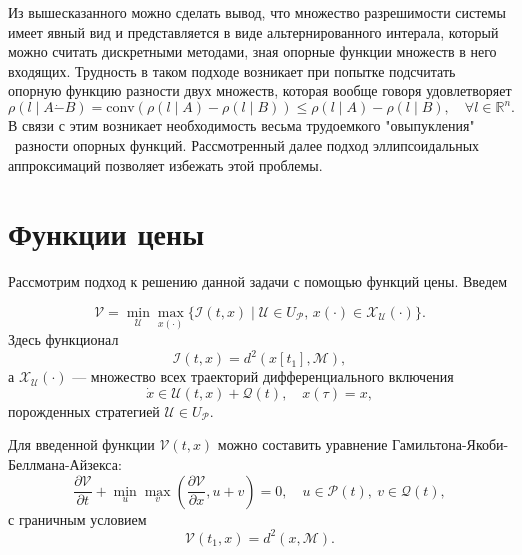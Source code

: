 Из вышесказанного можно сделать вывод, что множество разрешимости системы имеет явный вид и
 представляется в виде альтернированного интерала, который можно считать дискретными методами,
 зная опорные функции множеств в него входящих. Трудность в таком подходе возникает при попытке
 подсчитать опорную функцию разности двух множеств, которая вообще говоря удовлетворяет
\begin{equation*}
    \rho(l \mid A \dot{-} B) = \text{conv}( \rho(l \mid A) - \rho(l \mid B)) \le \rho(l \mid A) -
      \rho(l \mid B), \quad \forall l \in \mathbb{R}^n.
\end{equation*}
В связи с этим возникает необходимость весьма трудоемкого "овыпукления" \ разности опорных функций.
Рассмотренный далее подход эллипсоидальных аппроксимаций позволяет избежать этой проблемы.

\section{Функции цены}
Рассмотрим подход к решению данной задачи с помощью функций цены. Введем

\begin{equation*}
    \mathcal{V} = \min_{\mathcal{U}} \max_{x(\cdot)} \{\mathcal{I}(t,x) \mid \mathcal{U} \in 
     U_{\mathcal{P}}, \, x(\cdot) \in \mathcal{X}_{\mathcal{U}}(\cdot) \}.
\end{equation*}
Здесь функционал
\begin{equation*}
     \mathcal{I}(t,x) = d^2(x[t_1], \mathcal{M}),
\end{equation*}
а \( \mathcal{X}_{\mathcal{U}}(\cdot) \) --- множество всех траекторий дифференциального включения
\begin{equation*}
    \dot{x} \in \mathcal{U}(t,x) + \mathcal{Q}(t), \quad x(\tau) = x,
\end{equation*}
порожденных стратегией \( \mathcal{U} \in U_{\mathcal{P}} \).

Для введенной функции \( \mathcal{V}(t,x) \) можно составить уравнение Гамильтона-Якоби-Беллмана-Айзекса:
\begin{equation}\label{HJBI}
    \frac{\partial \mathcal{V}}{\partial t} + \min_u \max_v \left( \frac{\partial \mathcal{V}}
     {\partial x}, u + v \right) = 0, \quad u \in \mathcal{P}(t), \ v \in \mathcal{Q}(t),
\end{equation}
с граничным условием
\begin{equation}\label{HJBI_boundary}
    \mathcal{V}(t_1, x) = d^2(x, \mathcal{M}).
\end{equation}

